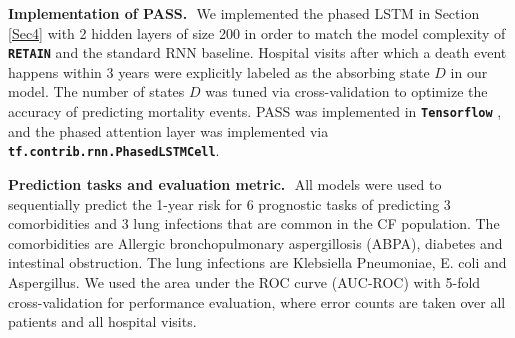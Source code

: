 \documentclass[twoside,11pt]{article}
\begin{document}
{\bf Implementation of PASS.}\,\, We implemented the phased LSTM in Section \ref{Sec4} with 2 hidden layers of size 200 in order to match the model complexity of {\small {\textbf{\texttt{RETAIN}}}} and the standard RNN baseline. Hospital visits after which a death event happens within 3 years were explicitly labeled as the absorbing state \mbox{\footnotesize $D$} in our model. The number of states \mbox{\footnotesize $D$} was tuned via cross-validation to optimize the accuracy of predicting mortality events. PASS was implemented in {\small {\textbf{\texttt{Tensorflow}}}} \cite{abadi2016tensorflow}, and the phased attention layer was implemented via {\small {\textbf{\texttt{tf.contrib.rnn.PhasedLSTMCell}}}}. 

{\bf Prediction tasks and evaluation metric.}\,\, All models were used to sequentially predict the 1-year risk for 6 prognostic tasks of predicting 3 comorbidities and 3 lung infections that are common in the CF population. The comorbidities are Allergic bronchopulmonary aspergillosis (ABPA), diabetes and intestinal obstruction. The lung infections are Klebsiella Pneumoniae, E. coli and Aspergillus. We used the area under the ROC curve (AUC-ROC) with 5-fold cross-validation for performance evaluation, where error counts are taken over all patients and all hospital visits.
\end{document}
